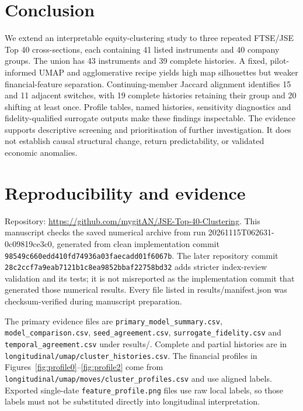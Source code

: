 \FloatBarrier
\section{Conclusion}

We extend an interpretable equity-clustering study to three repeated FTSE/JSE Top 40 cross-sections, each containing 41 listed instruments and 40 company groups. The union has 43 instruments and 39 complete histories. A fixed, pilot-informed UMAP and agglomerative recipe yields high map silhouettes but weaker financial-feature separation. Continuing-member Jaccard alignment identifies 15 and 11 adjacent switches, with 19 complete histories retaining their group and 20 shifting at least once. Profile tables, named histories, sensitivity diagnostics and fidelity-qualified surrogate outputs make these findings inspectable. The evidence supports descriptive screening and prioritisation of further investigation. It does not establish causal structural change, return predictability, or validated economic anomalies.


\FloatBarrier\appendix\section{Reproducibility and evidence}

Repository: \url{https://github.com/mygitAN/JSE-Top-40-Clustering}. This manuscript checks the saved numerical archive from run 20261115T062631-0c09819ce3c0, generated from clean implementation commit \nolinkurl{98549c660edd410fd74936a03faecadd01f6067b}. The later repository commit \nolinkurl{28c2ccf7a9eab7121b1c8ea9852bbaf22758bd32} adds stricter index-review validation and its tests; it is not misreported as the implementation commit that generated those numerical results. Every file listed in results/manifest.json was checksum-verified during manuscript preparation.


The primary evidence files are \nolinkurl{primary_model_summary.csv}, \nolinkurl{model_comparison.csv}, \nolinkurl{seed_agreement.csv}, \nolinkurl{surrogate_fidelity.csv} and \nolinkurl{temporal_agreement.csv} under results/. Complete and partial histories are in \nolinkurl{longitudinal/umap/cluster_histories.csv}. The financial profiles in Figures~\ref{fig:profile0}--\ref{fig:profile2} come from \nolinkurl{longitudinal/umap/moves/cluster_profiles.csv} and use aligned labels. Exported single-date \nolinkurl{feature_profile.png} files use raw local labels, so those labels must not be substituted directly into longitudinal interpretation.


